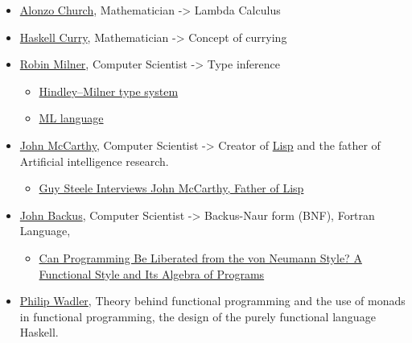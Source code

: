 \documentclass[11pt]{article}
\begin{document}
\begin{itemize}
\item \href{https://en.wikipedia.org/wiki/Alonzo_Church}{Alonzo Church}, Mathematician -> Lambda Calculus

\item \href{https://en.wikipedia.org/wiki/Haskell_Curry}{Haskell Curry}, Mathematician -> Concept of currying

\item \href{https://en.wikipedia.org/wiki/Robin_Milner}{Robin Milner}, Computer Scientist -> Type inference

\begin{itemize}
\item \href{https://en.wikipedia.org/wiki/Hindley\%E2\%80\%93Milner_type_system}{Hindley–Milner type system}

\item \href{https://en.wikipedia.org/wiki/ML_(programming_language}{ML language}
\end{itemize}

\item \href{https://en.wikipedia.org/wiki/John_McCarthy_(computer_scientist}{John McCarthy},  Computer Scientist -> Creator of \href{https://en.wikipedia.org/wiki/Lisp_(programming_language}{Lisp} and the
father of Artificial intelligence research.

\begin{itemize}
\item \href{http://www.infoq.com/interviews/Steele-Interviews-John-McCarthy}{Guy Steele Interviews John McCarthy, Father of Lisp}
\end{itemize}

\item \href{https://en.wikipedia.org/wiki/John_Backus}{John Backus}, Computer Scientist ->  Backus-Naur form (BNF), Fortran
Language, 

\begin{itemize}
\item \href{https://web.stanford.edu/class/cs242/readings/backus.pdf}{Can Programming Be Liberated from the von Neumann Style? A Functional Style and Its Algebra of Programs}
\end{itemize}

\item \href{https://en.wikipedia.org/wiki/Philip_Wadler}{Philip Wadler}, Theory behind functional programming and the use of
monads in functional programming, the design of the purely
functional language Haskell.


\end{itemize}
\end{document}
